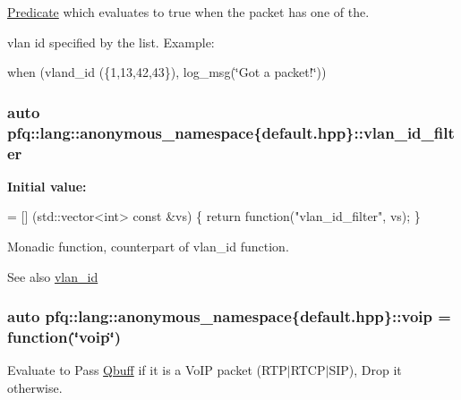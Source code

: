 \hyperlink{structpfq_1_1lang_1_1Predicate}{Predicate} which evaluates to {\ttfamily true} when the packet has one of the. 

vlan id specified by the list. Example\+:

when (vland\+\_\+id (\{1,13,42,43\}), log\+\_\+msg(\char`\"{}\+Got a packet!\char`\"{})) 
\subsubsection[{\texorpdfstring{vlan\+\_\+id\+\_\+filter}{vlan_id_filter}}]{\setlength{\rightskip}{0pt plus 5cm}auto pfq\+::lang\+::anonymous\+\_\+namespace\{default.\+hpp\}\+::vlan\+\_\+id\+\_\+filter}\hypertarget{namespacepfq_1_1lang_1_1anonymous__namespace_02default_8hpp_03_ab843ad210e98a7c8a4218efaf60f8c01}{}\label{namespacepfq_1_1lang_1_1anonymous__namespace_02default_8hpp_03_ab843ad210e98a7c8a4218efaf60f8c01}
{\bfseries Initial value\+:}
\begin{DoxyCode}
= [] (std::vector<int> \textcolor{keyword}{const} &vs) \{
                                    \textcolor{keywordflow}{return} \textcolor{keyword}{function}(\textcolor{stringliteral}{"vlan\_id\_filter"}, vs);
                              \}
\end{DoxyCode}


Monadic function, counterpart of {\ttfamily vlan\+\_\+id} function. 

\begin{DoxySeeAlso}{See also}
\hyperlink{namespacepfq_1_1lang_1_1anonymous__namespace_02default_8hpp_03_ad2a631020f34bf10335ebb0e79f03920}{vlan\+\_\+id} 
\end{DoxySeeAlso}
\subsubsection[{\texorpdfstring{voip}{voip}}]{\setlength{\rightskip}{0pt plus 5cm}auto pfq\+::lang\+::anonymous\+\_\+namespace\{default.\+hpp\}\+::voip = {\bf function}(\char`\"{}voip\char`\"{})}\hypertarget{namespacepfq_1_1lang_1_1anonymous__namespace_02default_8hpp_03_a814df3093ef905eedf9a9add4c625147}{}\label{namespacepfq_1_1lang_1_1anonymous__namespace_02default_8hpp_03_a814df3093ef905eedf9a9add4c625147}


Evaluate to {\ttfamily Pass} \hyperlink{structpfq_1_1lang_1_1Qbuff}{Qbuff} if it is a Vo\+IP packet (R\+T\+P$\vert$\+R\+T\+C\+P$\vert$\+S\+IP), {\ttfamily Drop} it otherwise. 


